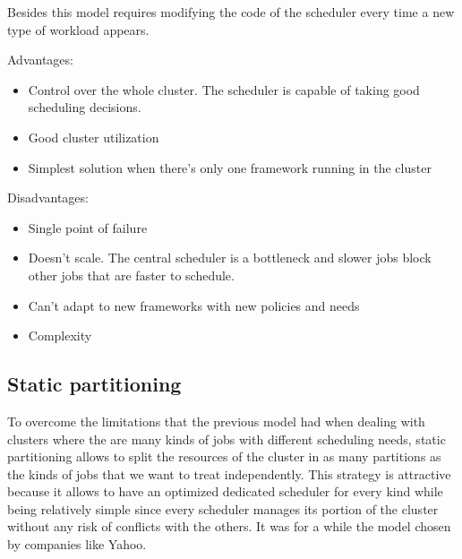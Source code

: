 \documentclass{svjour3}                     %
\begin{document}
Besides this model requires modifying the code of the scheduler every
time a new type of workload appears. 

Advantages:

\begin{itemize}
  \item Control over the whole cluster. The scheduler is capable of taking good scheduling decisions.
  \item Good cluster utilization
  \item Simplest solution when there's only one framework running in the cluster
\end{itemize}

Disadvantages:

\begin{itemize}
  \item Single point of failure
  \item Doesn't scale. The central scheduler is a bottleneck and
    slower jobs block other jobs that are faster to schedule.
  \item Can't adapt to new frameworks with new policies and needs
  \item Complexity
\end{itemize}

\subsection{Static partitioning}

To overcome the limitations that the previous model had when dealing
with clusters where the are many kinds of jobs with different scheduling
needs, static partitioning allows to split the resources of the cluster
in as many partitions as the kinds of jobs that we want to
treat independently. This strategy is attractive because it allows to
have an optimized dedicated scheduler for every kind while being
relatively simple since every scheduler manages its portion of the
cluster without any risk of conflicts with the others. It was
for a while the model chosen by companies like Yahoo.
\end{document}
